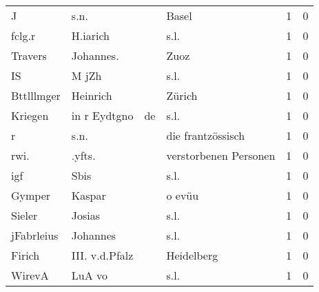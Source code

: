 \begin{tabular}{llllrr}
                        J &                               s.n. &             &                                       Basel &          1 &         0 \\
                   fclg.r &                           H.iarich &             &                                        s.l. &          1 &         0 \\
                  Travers &                          Johannes. &             &                                        Zuoz &          1 &         0 \\
                       IS &                              M jZh &             &                                        s.l. &          1 &         0 \\
               Bttlllmger &                           Heinrich &             &                                      Zürich &          1 &         0 \\
                  Kriegen &                       in r Eydtgno &          de &                                        s.l. &          1 &         0 \\
                        r &                               s.n. &             &                           die frantzössisch &          1 &         0 \\
                     rwi. &                             .yfts. &             &                       verstorbenen Personen &          1 &         0 \\
                      igf &                               Sbis &             &                                        s.l. &          1 &         0 \\
                   Gymper &                             Kaspar &             &                                      o evüu &          1 &         0 \\
                   Sieler &                             Josias &             &                                        s.l. &          1 &         0 \\
               jFabrleius &                           Johannes &             &                                        s.l. &          1 &         0 \\
                   Firich &                     III. v.d.Pfalz &             &                                  Heidelberg &          1 &         0 \\
                   WirevA &                             LuA vo &             &                                        s.l. &          1 &         0 \\

\end{tabular}
